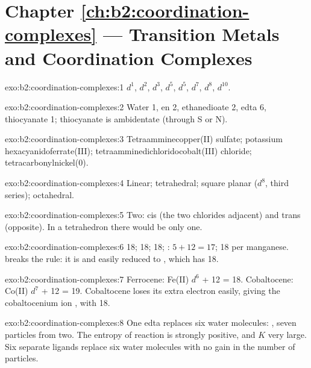 \section*{Chapter \ref{ch:b2:coordination-complexes} --- Transition Metals and Coordination Complexes}

\begin{solution}{exo:b2:coordination-complexes:1}
 $d^1$,  $d^2$,  $d^3$,  $d^5$,  $d^5$, 
$d^7$,  $d^8$,  $d^{10}$.
\end{solution}

\begin{solution}{exo:b2:coordination-complexes:2}
Water 1, en 2, ethanedioate 2, edta 6, thiocyanate 1; thiocyanate is ambidentate
(through S or N).
\end{solution}

\begin{solution}{exo:b2:coordination-complexes:3}
Tetraamminecopper(II) sulfate; potassium hexacyanidoferrate(III);
tetraamminedichloridocobalt(III) chloride; tetracarbonylnickel(0).
\end{solution}

\begin{solution}{exo:b2:coordination-complexes:4}
Linear; tetrahedral; square planar ($d^8$, third series); octahedral.
\end{solution}

\begin{solution}{exo:b2:coordination-complexes:5}
Two: cis (the two chlorides adjacent) and trans (opposite). In a tetrahedron there
would be only one.
\end{solution}

\begin{solution}{exo:b2:coordination-complexes:6}
 18;  18;  18; : $5 + 12 = 17$;
 18 per manganese.  breaks the rule: it is  and
easily reduced to \ce{[V(CO)6]-}, which has 18.
\end{solution}

\begin{solution}{exo:b2:coordination-complexes:7}
Ferrocene: Fe(II) $d^6$ + 12 = 18. Cobaltocene: Co(II) $d^7$ + 12 = 19. Cobaltocene loses
its extra electron easily, giving the cobaltocenium ion \ce{[Co(C5H5)2]+}, with 18.
\end{solution}

\begin{solution}{exo:b2:coordination-complexes:8}
One edta replaces six water molecules: , seven particles from two. The entropy of reaction is strongly positive, and
$K$ very large. Six separate ligands replace six water molecules with no gain in the
number of particles.
\end{solution}

